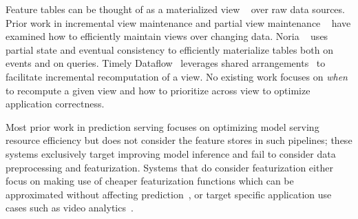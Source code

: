  Feature tables can be thought of as a materialized view ~\cite{materialized-views} over raw data sources. Prior work in incremental view maintenance and partial view maintenance ~\cite{partially-materialized-views} have examined how to efficiently maintain views over changing data. Noria ~\cite{noria} uses partial state and eventual consistency to efficiently materialize tables both on events and on queries. Timely Dataflow~\cite{timely-dataflow-book} leverages shared arrangements~\cite{DBLP:journals/pvldb/McSherryLSR20} to facilitate incremental recomputation of a view. No existing work focuses on \textit{when} to recompute a given view and how to prioritize across view to optimize application correctness. 

 Most prior work in prediction serving \cite{clipper,crankshaw2020inferline} focuses on optimizing model
serving resource efficiency but does not consider the feature stores in
such pipelines; these systems exclusively target improving model inference and fail to consider data preprocessing and featurization. Systems
that do consider featurization either focus on making use of cheaper 
featurization functions which can be approximated without affecting prediction~\cite{willump}, or target specific application use cases such as video analytics~\cite{li2020towards,jiang2018chameleon,bhardwaj2020ekya}.



